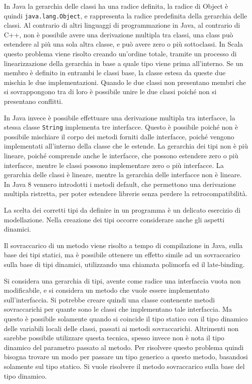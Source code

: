 \documentclass{article}
\numberwithin{equation}{subsection}
\begin{document}
In Java la gerarchia delle classi ha una radice definita, la radice di Object è quindi \verb|java.lang.Object|, e rappresenta la radice predefinita della gerarchia delle classi. 
Al contrario di altri linguaggi di programmazione in Java, al contrario di C++, non è possibile avere una derivazione multipla tra classi, una class può estendere al più una 
sola altra classe, e può avere zero o più sottoclassi. 
In Scala questo problema viene risolto creando un'ordine totale, tramite un processo di linearizzazione della gerarchia in base a quale tipo viene prima all'interno. 
Se un membro è definito in entrambi le classi base, la classe estesa da queste due mischia le due implementazioni. Quando le due classi non presentano membri che 
si sovrappongono tra di loro è possibile unire le due classi poiché non si presentano conflitti. 

In Java invece è possibile effettuare una derivazione multipla tra interfacce, la stessa classe \verb|String| implementa tre interfacce. Questo è possibile poiché non è 
possibile mischiare il corpo dei metodi forniti dalle interfacce, poiché vengono implementati all'interno della classe che le estende. 
La gerarchia dei tipi non è più lineare, poiché comprende anche le interfacce, che possono estendere zero o più interfacce, mentre le classi possono implementare zero o più 
interfacce. 
La gerarchia delle classi è lineare, mentre la gerarchia delle interfacce non è lineare. In Java 8 vennero introdotti i metodi default, che permettono una derivazione multipla 
ristretta, per poter estendere librerie senza perdere la retrocompatibilità. 


La scelta dei corretti tipi da definire in un programma è un delicato esercizio di modellazione. Nella creazione dei tipi occorre considerare anche gli aspetti dinamici. 


Il sovraccarico di un metodo viene risolto a tempo di compilazione in Java, sulla base dei tipi statici, ma è possibile ottenere un effetto simile ad un sovraccarico sulla base 
di tipi dinamici, utilizzando una chiamata polimorfa ed il late-binding. 

Si considera una gerarchia di tipi, avente come radice una interfaccia vuota non modificabile, e si considera un metodo che vuole essere implementato sull'interfaccia. 
Si potrebbe creare quindi una classe contenente metodi sovraccarichi per quante sono le classi che implementano tale interfaccia. Ma questo è possibile solamente quando si 
coincide il tipo statico con il tipo dinamico delle variabili locali delle classi, passati ai metodi sovraccarichi. Altrimenti non sarebbe possibile utilizzare questa tecnica, 
spesso invece non è nota il tipo dinamico del parametro passato al metodo. 
Per risolvere questo problema quindi bisogna trovare un modo per passare un tipo generico a questo metodo, basandosi solamente sul tipo statico. Si vuole risolvere il metodo 
sovraccarico sulla base del tipo dinamico.  
\end{document}
